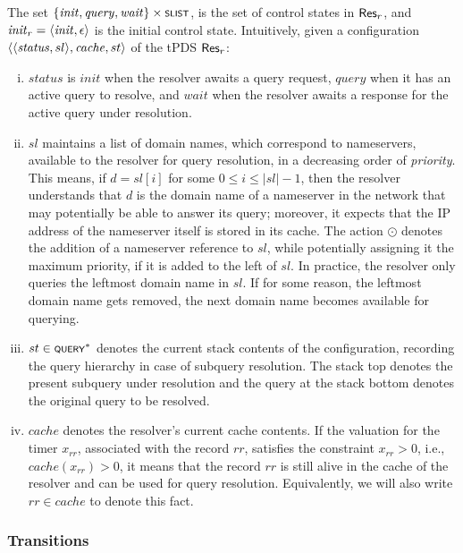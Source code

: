 The set $\{\mathit{init},\mathit{query}, \mathit{wait}\} \times \scrsf{slist}$, is the set of control states in $\mathsf{Res}_{r}$, and $\mathit{init}_r = \langle \mathit{init},\epsilon \rangle$ is the initial control state. Intuitively, given a configuration $\langle \langle \mathit{status},sl \rangle, \mathit{cache}, st \rangle$ of the tPDS $\mathsf{Res}_{r}$:



\begin{enumerate}[(i)]
	\item $\mathit{status}$ is $\mathit{init}$ when the resolver awaits a query request, $\mathit{query}$ when it has an active query to resolve, and $\mathit{wait}$ when the resolver awaits a response for the active query under resolution.
	\item $sl$ maintains a list of domain names, which correspond to nameservers, available to the resolver for query resolution, in a decreasing order of \emph{priority}. This means, if $d = sl[i]$ for some $0 \leq i \leq |sl| - 1$, then the resolver understands that $d$ is the domain name of a nameserver in the network that may potentially be able to answer its query; moreover, it expects that the IP address of the nameserver itself is stored in its cache. The action $\odot$ denotes the addition of a nameserver reference to $sl$, while potentially assigning it the maximum priority, if it is added to the left of $sl$. In practice, the resolver only queries the leftmost domain name in $sl$. If for some reason, the leftmost domain name gets removed, the next domain name becomes available for querying.
	\item $st\in\scrsf{query}^*$ denotes the current stack contents of the configuration, recording the query hierarchy in case of subquery resolution. The stack top denotes the present subquery under resolution and the query at the stack bottom
	denotes the original query to be resolved.
	\item $cache$ denotes the resolver's current cache contents. If the valuation for the timer $x_{rr}$, associated with the record $rr$, satisfies the constraint $x_{rr} > 0$, i.e., $cache(x_{rr}) > 0$, it means that the record $rr$ is still alive in the cache of the resolver and can be used for query resolution. Equivalently, we will also write $rr \in cache$ to denote this fact.
\end{enumerate}


\subsubsection{Transitions}



